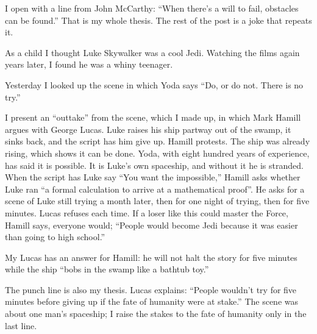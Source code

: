 
I open with a line from John McCarthy: ``When there's a will to fail, obstacles can be found.'' That is my whole thesis. The rest of the post is a joke that repeats it.

As a child I thought Luke Skywalker was a cool Jedi. Watching the films again years later, I found he was a whiny teenager.

Yesterday I looked up the scene in which Yoda says ``Do, or do not. There is no try.'' 

I present an ``outtake'' from the scene, which I made up, in which Mark Hamill argues with George Lucas. Luke raises his ship partway out of the swamp, it sinks back, and the script has him give up. Hamill protests. The ship was already rising, which shows it can be done. Yoda, with eight hundred years of experience, has said it is possible. It is Luke's own spaceship, and without it he is stranded. When the script has Luke say ``You want the impossible,'' Hamill asks whether Luke ran ``a formal calculation to arrive at a mathematical proof''. He asks for a scene of Luke still trying a month later, then for one night of trying, then for five minutes. Lucas refuses each time. If a loser like this could master the Force, Hamill says, everyone would; ``People would become Jedi because it was easier than going to high school.''


My Lucas has an answer for Hamill: he will not halt the story for five minutes while the ship ``bobs in the swamp like a bathtub toy.'' 

The punch line is also my thesis. Lucas explains: ``People wouldn't try for five minutes before giving up if the fate of humanity were at stake.'' The scene was about one man's spaceship; I raise the stakes to the fate of humanity only in the last line. 
